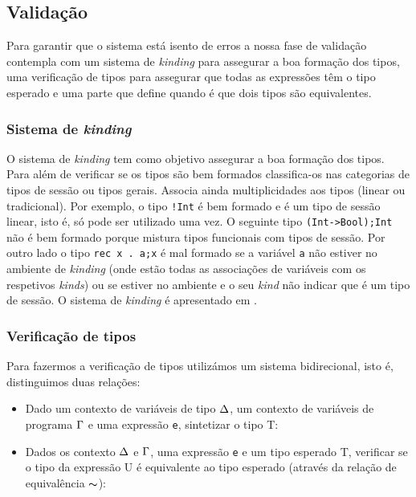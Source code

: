 
\subsection{Validação}

Para garantir que o sistema está isento de erros a nossa fase de validação contempla com um sistema de \textit{kinding} para assegurar a boa formação dos tipos, uma verificação de tipos para assegurar que todas as expressões têm o tipo esperado e uma parte que define quando é que dois tipos são equivalentes.

\subsubsection{Sistema de \textit{kinding}}
O sistema de \textit{kinding} tem como objetivo assegurar a boa formação dos tipos. Para além de verificar se os tipos são bem formados classifica-os nas categorias de tipos de sessão ou tipos gerais. Associa ainda multiplicidades aos tipos (linear ou tradicional).
Por exemplo, o tipo \lstinline|!Int| é bem formado e é um tipo de sessão linear, isto é, só pode ser utilizado uma vez. O seguinte tipo \lstinline|(Int->Bool);Int| não é bem formado porque mistura tipos funcionais com tipos de sessão. Por outro lado o tipo \lstinline|rec x . a;x| é mal formado se a variável \lstinline|a| não estiver no ambiente de \textit{kinding} (onde estão todas as associações de variáveis com os respetivos \textit{kinds}) ou se estiver no ambiente e o seu \textit{kind} não indicar que é um tipo de sessão. O sistema de \textit{kinding} é apresentado em \cite{ref-cfst}.

\subsubsection{Verificação de tipos}
Para fazermos a verificação de tipos utilizámos um sistema bidirecional, isto é, distinguimos duas relações:
\begin{itemize}
\item Dado um contexto de variáveis de tipo $\Delta$, um contexto de variáveis de programa $\Gamma$ e uma expressão \lstinline|e|, sintetizar o tipo T: 
\item Dados os contexto $\Delta$ e $\Gamma$, uma expressão \lstinline|e| e um tipo esperado T, verificar se o tipo da expressão U é equivalente ao tipo esperado (através da relação de equivalência $\thicksim$):%
    
\end{itemize}

